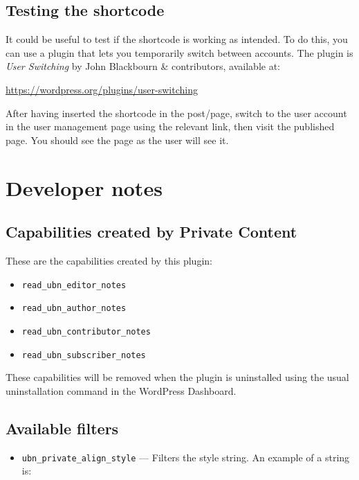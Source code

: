\chapter{Testing the shortcode}

It could be useful to test if the shortcode is working as intended. To do this,
you can use a plugin that lets you temporarily switch between accounts. The
plugin is \textit{User Switching} by John Blackbourn \& contributors, available
at:
\begin{center}
  \url{https://wordpress.org/plugins/user-switching}
\end{center}

After having inserted the shortcode in the post/page, switch to the user account
in the user management page using the relevant link, then visit the published
page. You should see the page as the user will see it.

\part{Developer notes}

\chapter{Capabilities created by Private Content}

These are the capabilities created by this plugin:

\begin{itemize}
 \item \verb+read_ubn_editor_notes+
 \item \verb+read_ubn_author_notes+
 \item \verb+read_ubn_contributor_notes+
 \item \verb+read_ubn_subscriber_notes+
\end{itemize}

These capabilities will be removed when the plugin is uninstalled using the
usual uninstallation command in the WordPress Dashboard.

\chapter{Available filters}

\begin{itemize}
 \item \verb+ubn_private_align_style+ --- Filters the style string. An example of
 a string is:
\end{itemize}

